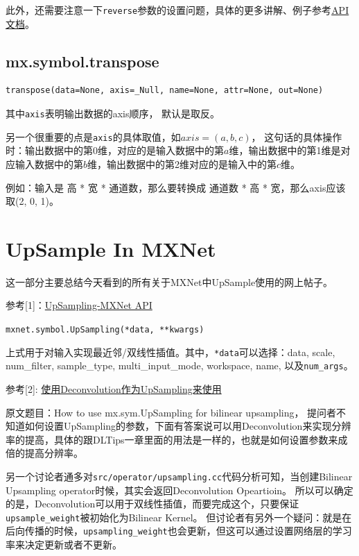 此外，还需要注意一下\verb|reverse|参数的设置问题，具体的更多讲解、例子参考\href{https://mxnet.incubator.apache.org/api/python/symbol/symbol.html?highlight=reshape#mxnet.symbol.reshape}{API文档}。


\subsection{mx.symbol.transpose}

\begin{verbatim}
transpose(data=None, axis=_Null, name=None, attr=None, out=None)
\end{verbatim}

其中\verb|axis|表明输出数据的axis顺序， 默认是取反。

另一个很重要的点是\verb|axis|的具体取值，如$axis=(a, b, c)$， 这句话的具体操作时：输出数据中的第0维，对应的是输入数据中的第$a$维，输出数据中的第1维是对应输入数据中的第$b$维，输出数据中的第2维对应的是输入中的第$c$维。

例如：输入是 高 * 宽 * 通道数，那么要转换成 通道数 * 高 * 宽，那么axis应该取(2, 0, 1)。

\section{UpSample In MXNet}

这一部分主要总结今天看到的所有关于MXNet中UpSample使用的网上帖子。

参考[1]：\href{https://mxnet.incubator.apache.org/api/python/symbol/symbol.html?highlight=upsampling#mxnet.symbol.UpSampling}{UpSampling-MXNet API}

\verb|mxnet.symbol.UpSampling(*data, **kwargs)|

上式用于对输入实现最近邻/双线性插值。其中，\verb|*data|可以选择：data, scale, num\_filter, sample\_type, multi\_input\_mode, workspace, name, 以及\verb|num_args|。

参考[2]: \href{https://github.com/apache/incubator-mxnet/issues/4134}{使用Deconvolution作为UpSampling来使用}

原文题目：How to use mx.sym.UpSampling for bilinear upsampling， 提问者不知道如何设置UpSampling的参数，下面有答案说可以用Deconvolution来实现分辨率的提高，具体的跟DLTips一章里面的用法是一样的，也就是如何设置参数来成倍的提高分辨率。

另一个讨论者通多对\verb|src/operator/upsampling.cc|代码分析可知，当创建Bilinear Upsampling operator时候，其实会返回Deconvolution Opeartioin。 所以可以确定的是，Deconvolution可以用于双线性插值，而要完成这个，只要保证\verb|upsample_weight|被初始化为Bilinear Kernel。 但讨论者有另外一个疑问：就是在后向传播的时候，\verb|upsampling_weight|也会更新，但这可以通过设置网络层的学习率来决定更新或者不更新。

